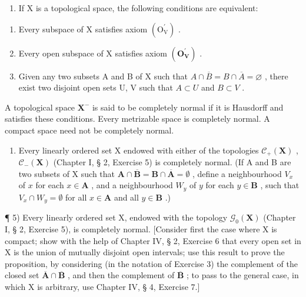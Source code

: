 \begin{enumerate}
\def\labelenumi{\arabic{enumi})}
\setcounter{enumi}{2}
\tightlist
\item
  If X is a topological space, the following conditions are equivalent:
\end{enumerate}

\begin{enumerate}
\def\labelenumi{\alph{enumi})}
\item
  Every subspace of X satisfies axiom \((\mathrm{O}_{\mathrm{V}}^{\prime})\) .
\item
  Every open subspace of X satisfies axiom \((\mathbf{O}_{\mathbf{V}}^{\prime})\) .
\item
  Given any two subsets A and B of X such that \(A \cap \overline{B} = B \cap \overline{A} = \varnothing\) , there exist two disjoint open sets U, V such that \(A \subset U\) and \(B \subset V\) .
\end{enumerate}

A topological space \(\mathbf{X}^{-}\) is said to be completely normal if it is Hausdorff and satisfies these conditions. Every metrizable space is completely normal. A compact space need not be completely normal.

\begin{enumerate}
\def\labelenumi{\arabic{enumi})}
\setcounter{enumi}{3}
\tightlist
\item
  Every linearly ordered set X endowed with either of the topologies \(\mathcal{C}_{+}(\mathbf{X})\) , \(\mathcal{C}_{-}(\mathbf{X})\) (Chapter I, § 2, Exercise 5) is completely normal. (If A and B are two subsets of X such that \(\mathbf{A} \cap \overline{\mathbf{B}} = \mathbf{B} \cap \overline{\mathbf{A}} = \emptyset\) , define a neighbourhood \(V_{x}\) of \(x\) for each \(x \in \mathbf{A}\) , and a neighbourhood \(W_{y}\) of \(y\) for each \(y \in \mathbf{B}\) , such that \(V_{x} \cap W_{y} = \emptyset\) for all \(x \in \mathbf{A}\) and all \(y \in \mathbf{B}\) .)
\end{enumerate}

¶ 5) Every linearly ordered set X, endowed with the topology \(\mathcal{G}_{0}(\mathbf{X})\) (Chapter I, § 2, Exercise 5), is completely normal. {[}Consider first the case where X is compact; show with the help of Chapter IV, § 2, Exercise 6 that every open set in X is the union of mutually disjoint open intervals; use this result to prove the proposition, by considering (in the notation of Exercise 3) the complement of the closed set \(\overline{\mathbf{A}}\cap\overline{\mathbf{B}}\) , and then the complement of \(\overline{\mathbf{B}}\) ; to pass to the general case, in which X is arbitrary, use Chapter IV, § 4, Exercise 7.{]}

